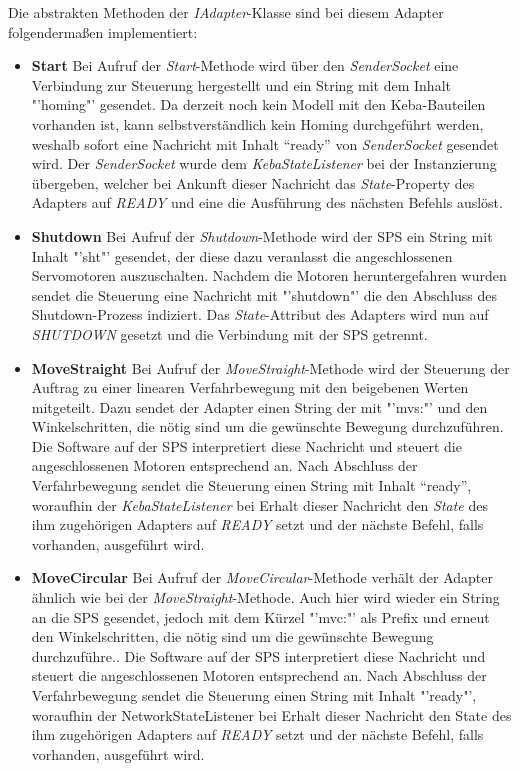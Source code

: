 Die abstrakten Methoden der \textit{IAdapter}-Klasse sind bei diesem Adapter folgendermaßen implementiert:
\begin{itemize}
\item \textbf{Start}
\newline
Bei Aufruf der \textit{Start}-Methode wird über den \textit{SenderSocket} eine Verbindung zur Steuerung hergestellt und ein String mit dem Inhalt "'homing"' gesendet. Da derzeit noch kein Modell mit den Keba-Bauteilen vorhanden ist, kann selbstverständlich kein Homing durchgeführt werden, weshalb sofort eine Nachricht mit Inhalt “ready” von \textit{SenderSocket} gesendet wird. Der \textit{SenderSocket} wurde dem \textit{KebaStateListener} bei der Instanzierung übergeben, welcher bei Ankunft dieser Nachricht das \textit{State}-Property des Adapters auf \textit{READY} und eine die Ausführung des nächsten Befehls auslöst.
\item \textbf{Shutdown}
\newline
Bei Aufruf der \textit{Shutdown}-Methode wird der SPS ein String mit Inhalt "'sht"' gesendet, der diese dazu veranlasst die angeschlossenen Servomotoren auszuschalten. Nachdem die Motoren heruntergefahren wurden sendet die Steuerung eine Nachricht mit "'shutdown"' die den Abschluss des Shutdown-Prozess indiziert. Das \textit{State}-Attribut des Adapters wird nun auf \textit{SHUTDOWN} gesetzt und die Verbindung mit der SPS getrennt.
\item \textbf{MoveStraight}
\newline
Bei Aufruf der \textit{MoveStraight}-Methode wird der Steuerung der Auftrag zu einer linearen Verfahrbewegung mit den beigebenen Werten mitgeteilt. Dazu sendet der Adapter einen String der mit "'mvs:"' und den Winkelschritten, die nötig sind um die gewünschte Bewegung durchzuführen. Die Software auf der SPS interpretiert diese Nachricht und steuert die angeschlossenen Motoren entsprechend an. Nach Abschluss der Verfahrbewegung sendet die Steuerung einen String mit Inhalt “ready”, woraufhin der \textit{KebaStateListener} bei Erhalt dieser Nachricht den \textit{State} des ihm zugehörigen Adapters auf \textit{READY} setzt und der nächste Befehl, falls vorhanden, ausgeführt wird.
\item \textbf{MoveCircular}
\newline
Bei Aufruf der \textit{MoveCircular}-Methode verhält der Adapter ähnlich wie bei der \textit{MoveStraight}-Methode. Auch hier wird wieder ein String an die SPS gesendet, jedoch mit dem Kürzel "'mvc:"' als Prefix und erneut den Winkelschritten, die nötig sind um die gewünschte Bewegung durchzuführe.. Die Software auf der SPS interpretiert diese Nachricht und steuert die angeschlossenen Motoren entsprechend an.  Nach Abschluss der Verfahrbewegung sendet die Steuerung einen String mit Inhalt "'ready"', woraufhin der NetworkStateListener bei Erhalt dieser Nachricht den State des ihm zugehörigen Adapters auf \textit{READY} setzt und der nächste Befehl, falls vorhanden, ausgeführt wird.

\end{itemize}
